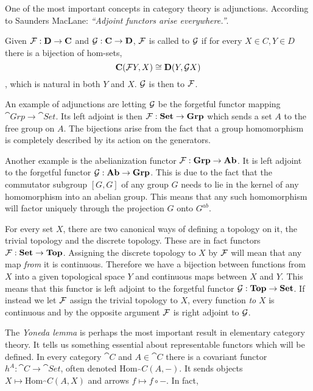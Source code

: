 \documentclass[../../main.tex]{subfiles}
\begin{document}
    One of the most important concepts in category theory is adjunctions. According to Saunders MacLane: \textit{“Adjoint functors arise everywhere.”}\cite{cate-mac}.
    
    \begin{definition}
        Given $\mathcal{F}: \mathbf{D} \to \mathbf{C}$ and $\mathcal{G}: \mathbf{C} \to \mathbf{D}$, $\mathcal{F}$ is called  to $\mathcal{G}$ if for every $X \in C, Y \in D$ there is a bijection of hom-sets, \[\mathbf{C}(\mathcal{F}Y, X) \cong \mathbf{D}(Y, \mathcal{G}X)\], which is natural in both $Y$ and $X$. $\mathcal{G}$ is then  to $\mathcal{F}$.
    \end{definition}
    
    An example of adjunctions are letting $\mathcal{G}$ be the forgetful functor mapping $\cat{Grp} \to \cat{Set}$. Its left adjoint is then $\mathcal{F}: \mathbf{Set} \to \mathbf{Grp}$ which sends a set $A$ to the free group on $A$. The bijections arise from the fact that a group homomorphism is completely described by its action on the generators.
    
    Another example is the abelianization functor $\mathcal{F}: \mathbf{Grp} \to \mathbf{Ab}$. It is left adjoint to the forgetful functor $\mathcal{G}: \mathbf{Ab} \to \mathbf{Grp}$. This is due to the fact that the commutator subgroup $[G, G]$ of any group $G$ needs to lie in the kernel of any homomorphism into an abelian group. This means that any such homomorphism will factor uniquely through the projection $G$ onto $G^{ab}$.
    
    For every set $X$, there are two canonical ways of defining a topology on it, the trivial topology and the discrete topology. These are in fact functors $\mathcal{F}: \mathbf{Set} \to \mathbf{Top}$. Assigning the discrete topology to $X$ by $\mathcal{F}$ will mean that any map \emph{from} it is continuous. Therefore we have a bijection between functions from $X$ into a given topological space $Y$ and continuous maps between $X$ and $Y$. This means that this functor is left adjoint to the forgetful functor $\mathcal{G}: \mathbf{Top} \to \mathbf{Set}$. If instead we let $\mathcal{F}$ assign the trivial topology to $X$, every function \emph{to} $X$ is continuous and by the opposite argument $\mathcal{F}$ is right adjoint to $\mathcal{G}$.
    
    The \emph{Yoneda lemma} is perhaps the most important result in elementary category theory. It tells us something essential about representable functors which will be defined. In every category $\cat{C}$ and $A \in \cat{C}$ there is a covariant functor $h^A: \cat{C} \to \cat{Set}$, often denoted $\mathrm{Hom}_\cat{C}(A, -)$. It sends objects $X \mapsto \mathrm{Hom}_\cat{C}(A, X)$ and arrows $f \mapsto f \circ -$. In fact, 
    
\end{document}
